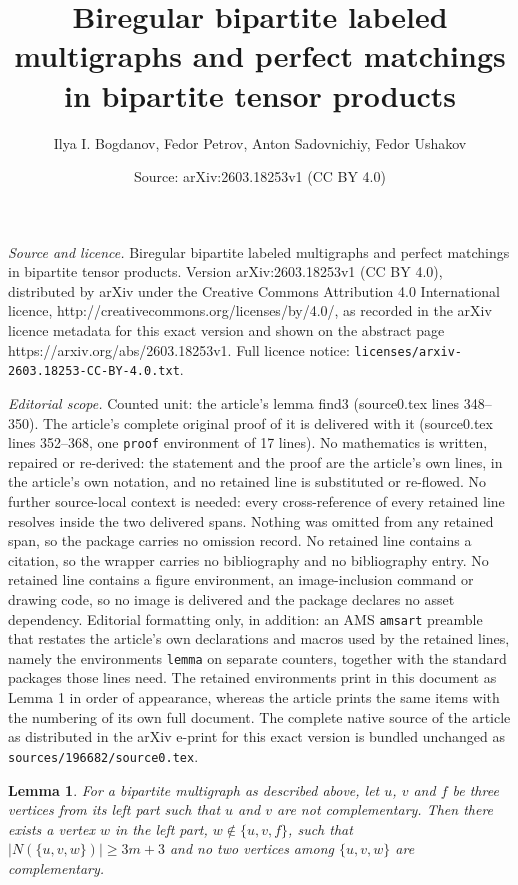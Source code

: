 \documentclass[10pt,a4paper]{amsart}
\title{Biregular bipartite labeled multigraphs and perfect matchings in bipartite tensor products}
\author{Ilya I. Bogdanov, Fedor Petrov, Anton Sadovnichiy, Fedor Ushakov}
\date{Source: arXiv:2603.18253v1 (CC BY 4.0)}
\newtheorem{lemma}{Lemma}
\renewcommand{\ge}{\geqslant}
\begin{document}
\maketitle

\noindent\emph{Source and licence.} Biregular bipartite labeled multigraphs and perfect matchings in bipartite tensor products. Version arXiv:2603.18253v1 (CC BY 4.0), distributed by arXiv under the Creative Commons Attribution 4.0 International licence, http://creativecommons.org/licenses/by/4.0/, as recorded in the arXiv licence metadata for this exact version and shown on the abstract page https://arxiv.org/abs/2603.18253v1. Full licence notice: \texttt{licenses/arxiv-2603.18253-CC-BY-4.0.txt}.\par\smallskip

\noindent\textit{Editorial scope.} Counted unit: the article's lemma find3 (source0.tex lines 348--350). The article's complete original proof of it is delivered with it (source0.tex lines 352--368, one \texttt{proof} environment of 17 lines). No mathematics is written, repaired or re-derived: the statement and the proof are the article's own lines, in the article's own notation, and no retained line is substituted or re-flowed.  No further source-local context is needed: every cross-reference of every retained line resolves inside the two delivered spans.  Nothing was omitted from any retained span, so the package carries no omission record.  No retained line contains a citation, so the wrapper carries no bibliography and no bibliography entry.  No retained line contains a figure environment, an image-inclusion command or drawing code, so no image is delivered and the package declares no asset dependency.  Editorial formatting only, in addition: an AMS \texttt{amsart} preamble that restates the article's own declarations and macros used by the retained lines, namely the environments \texttt{lemma} on separate counters, together with the standard packages those lines need.  The retained environments print in this document as Lemma 1 in order of appearance, whereas the article prints the same items with the numbering of its own full document.  The complete native source of the article as distributed in the arXiv e-print for this exact version is bundled unchanged as \texttt{sources/196682/source0.tex}.
\begin{lemma}\label{find3}
For a bipartite multigraph as described above, let $u$, $v$ and $f$ be three vertices from its left part such that $u$ and $v$ are not complementary. Then there exists a vertex $w$ in the left part, $w \notin \{u,v,f\}$, such that $|N(\{u,v,w\})| \ge 3m+3$ and no two vertices among $\{u,v,w\}$ are complementary.
\end{lemma}
\end{document}
